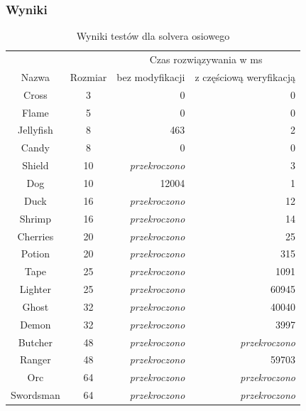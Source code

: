 \subsubsection{Wyniki}
\begin{table}[!htb]
    \begin{center}
        \begin{tabular}{|c|c|r r|}
            \hline
            {}          & {}        & \multicolumn{2}{c|}{Czas rozwiązywania w ms} \\
            Nazwa       & Rozmiar   & bez modyfikacji & z częściową weryfikacją \\
            \hline
            Cross       & 3         & 0                     & 0 \\
            Flame       & 5         & 0                     & 0 \\
            Jellyfish   & 8         & 463                   & 2 \\
            Candy       & 8         & 0                     & 0 \\
            Shield      & 10        & \textit{przekroczono} & 3 \\
            Dog         & 10        & 12004                 & 1 \\
            Duck        & 16        & \textit{przekroczono} & 12 \\
            Shrimp      & 16        & \textit{przekroczono} & 14 \\
            Cherries    & 20        & \textit{przekroczono} & 25 \\
            Potion      & 20        & \textit{przekroczono} & 315 \\
            Tape        & 25        & \textit{przekroczono} & 1091 \\
            Lighter     & 25        & \textit{przekroczono} & 60945 \\
            \hline
            Ghost       & 32        & \textit{przekroczono} & 40040 \\
            Demon       & 32        & \textit{przekroczono} & 3997 \\
            Butcher     & 48        & \textit{przekroczono} & \textit{przekroczono} \\
            Ranger      & 48        & \textit{przekroczono} & 59703 \\
            Orc         & 64        & \textit{przekroczono} & \textit{przekroczono} \\
            Swordsman   & 64        & \textit{przekroczono} & \textit{przekroczono} \\
            \hline
        \end{tabular}
    \end{center}
    \caption{Wyniki testów dla solvera osiowego}
\end{table}

